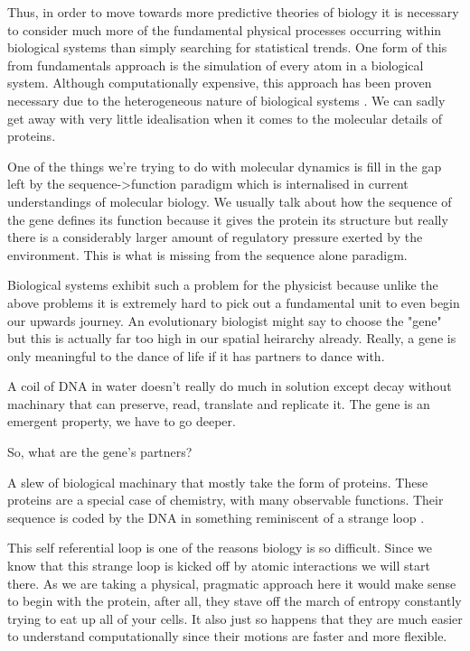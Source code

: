Thus, in order to move towards more predictive theories of biology it is necessary to consider much more of the fundamental physical processes occurring within biological systems than simply searching for statistical trends. One form of this from fundamentals approach is the simulation of every atom in a biological system. Although computationally expensive, this approach has been proven necessary due to the heterogeneous nature of biological systems \cite{moy2000, corry2000a}. We can sadly get away with very little idealisation when it comes to the molecular details of proteins.

One of the things we're trying to do with molecular dynamics is fill in the gap left by the sequence->function paradigm which is internalised in current understandings of molecular biology. We usually talk about how the sequence of the gene defines its function because it gives the protein its structure but really there is a considerably larger amount of regulatory pressure exerted by the environment. This is what is missing from the sequence alone paradigm.

Biological systems exhibit such a problem for the physicist because unlike the above problems it is extremely hard to pick out a fundamental unit to even begin our upwards journey. An evolutionary biologist might say to choose the "gene" but this is actually far too high in our spatial heirarchy already. Really, a gene is only meaningful to the dance of life if it has partners to dance with. 

A coil of DNA in water doesn't really do much in solution except decay without machinary that can preserve, read, translate and replicate it. The gene is an emergent property, we have to go deeper. 

So, what are the gene's partners? 

A slew of biological machinary that mostly take the form of proteins. These proteins are a special case of chemistry, with many observable functions. Their sequence is  coded by the DNA in something reminiscent of a strange loop \cite{hofstadter2007}. 


This self referential loop is one of the reasons biology is so difficult. Since we know that this strange loop is kicked off by atomic interactions we will start there. As we are taking a physical, pragmatic approach here it would make sense to begin with the protein, after all, they stave off the march of entropy constantly trying to eat up all of your cells. It also just so happens that they are much easier to understand computationally since their motions are faster and more flexible. 

